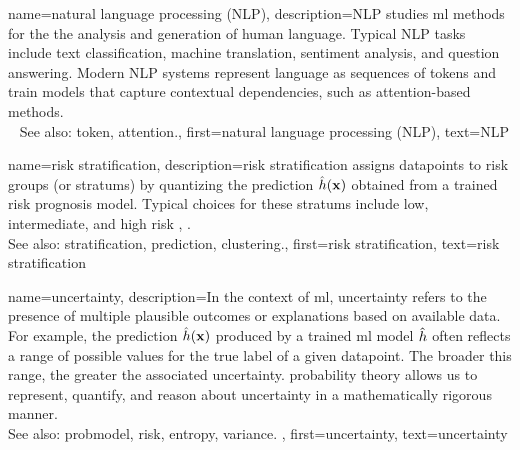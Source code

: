 {name={natural language processing (NLP)},
	description={NLP 
 		studies \gls{ml} methods for the the analysis and generation of human language. 
  		Typical NLP tasks include text \gls{classification}, machine translation, 
  		sentiment analysis, and question answering. Modern NLP systems represent 
  		language as \glspl{sequence} of \glspl{token} and train \glspl{model} that 
  		capture contextual dependencies, such as \gls{attention}-based methods.
		\\ 
  		See also: \gls{token}, \gls{attention}.}, 
	first={natural language processing (NLP)}, 
	text={NLP}
}

{name={risk stratification},
	description={\Gls{risk} \gls{stratification} assigns 
		\glspl{datapoint} to \gls{risk} groups (or \glspl{stratum}) by 
		quantizing the \gls{prediction} $\hat{h}({\bf x})$ 
		obtained from a trained \gls{risk} prognosis \gls{model}. Typical choices for these 
		\glspl{stratum} include low, intermediate, and high \gls{risk} 
             	\cite{Collins:2012aa}, \cite{Steyerberg2019}.
		\\
		See also: \gls{stratification}, \gls{prediction}, \gls{clustering}.},
	first={risk stratification},
	text={risk stratification}
}

{name={uncertainty},
	description={In the context of \gls{ml}, uncertainty refers to the presence of multiple 
		plausible \glspl{outcome} or \glspl{explanation} based on available \gls{data}. For example, the 
		\gls{prediction} $\hat{h}({\bf x})$ produced by a trained \gls{ml} \gls{model} $\hat{h}$
	 	often reflects a range of possible values for the true \gls{label} of a given \gls{datapoint}. 
	 	The broader this range, the greater the associated uncertainty. \Gls{probability} theory 
	 	allows us to represent, quantify, and reason about uncertainty in a 
	 	mathematically rigorous manner.
					\\ 
		See also: \gls{probmodel}, \gls{risk}, \gls{entropy}, \gls{variance}. },
	first={uncertainty},
	text={uncertainty}
}

